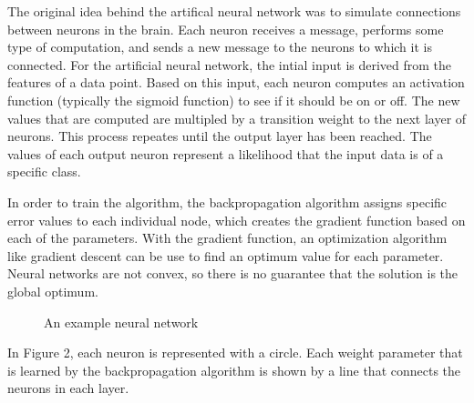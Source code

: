 \documentclass[11pt,a4paper,twocolumn]{article}
\begin{document}
The original idea behind the artifical neural network was to simulate connections between neurons in the brain. Each neuron receives a message, performs some type of computation, and sends a new message to the neurons to which it is connected. For the artificial neural network, the intial input is derived from the features of a data point. Based on this input, each neuron computes an activation function (typically the sigmoid function) to see if it should be on or off. The new values that are computed are multipled by a transition weight to the next layer of neurons. This process repeates until the output layer has been reached. The values of each output neuron represent a likelihood that the input data is of a specific class.

In order to train the algorithm, the backpropagation algorithm assigns specific error values to each individual node, which creates the gradient function based on each of the parameters. With the gradient function, an optimization algorithm like gradient descent can be use to find an optimum value for each parameter. Neural networks are not convex, so there is no guarantee that the solution is the global optimum.

\begin{figure}[h]
\centering
\caption{An example neural network}
\end{figure}

In Figure 2, each neuron is represented with a circle. Each weight parameter that is learned by the backpropagation algorithm is shown by a line that connects the neurons in each layer.
\end{document}
